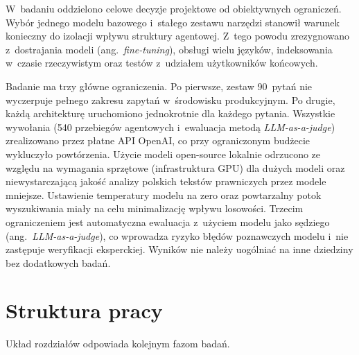 W~badaniu oddzielono celowe decyzje projektowe od obiektywnych ograniczeń.
Wybór jednego modelu bazowego i~stałego zestawu narzędzi stanowił warunek
konieczny do izolacji wpływu struktury agentowej. Z~tego powodu zrezygnowano
z~dostrajania modeli (ang.~\textit{fine-tuning}), obsługi wielu języków,
indeksowania w~czasie rzeczywistym oraz testów z~udziałem użytkowników
końcowych.

Badanie ma trzy główne ograniczenia. Po pierwsze, zestaw 90~pytań nie
wyczerpuje pełnego zakresu zapytań w~środowisku produkcyjnym. Po drugie, każdą
architekturę uruchomiono jednokrotnie dla każdego pytania. Wszystkie wywołania
(540 przebiegów agentowych i~ewaluacja metodą \textit{LLM-as-a-judge})
zrealizowano przez płatne API OpenAI, co przy ograniczonym budżecie wykluczyło
powtórzenia. Użycie modeli open-source lokalnie odrzucono ze względu na
wymagania sprzętowe (infrastruktura GPU) dla dużych modeli oraz
niewystarczającą jakość analizy polskich tekstów prawniczych przez modele
mniejsze. Ustawienie temperatury modelu na zero oraz powtarzalny potok
wyszukiwania miały na celu minimalizację wpływu losowości. Trzecim
ograniczeniem jest automatyczna ewaluacja z~użyciem modelu jako sędziego
(ang.~\textit{LLM-as-a-judge}), co wprowadza ryzyko błędów poznawczych modelu
i~nie zastępuje weryfikacji eksperckiej. Wyników nie należy uogólniać na inne
dziedziny bez dodatkowych badań.

\section{Struktura pracy}\label{sec:struktura-pracy}

Układ rozdziałów odpowiada kolejnym fazom badań.

